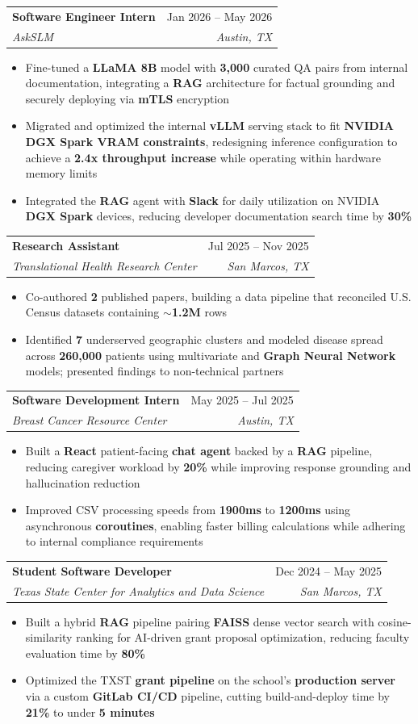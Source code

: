 \documentclass[letterpaper,10pt]{article}
\makeatletter
\newcommand{\resumeItem}[1]{
  \item\small{#1}\vspace{-3pt}
}
\newcommand{\resumeSubheading}[4]{
  \vspace{-2pt}\item
    \begin{tabular*}{0.97\textwidth}[t]{l@{\extracolsep{\fill}}r}
      \textbf{#3} & #2 \\
      \textit{\small#1} & \textit{\small #4} \\
    \end{tabular*}\vspace{-6pt}
}
\newcommand{\resumeItemListStart}{
  \begin{itemize}
}
\newcommand{\resumeItemListEnd}{
  \end{itemize}\vspace{-6pt}
}
\makeatother
\begin{document}
\resumeSubheading
  {AskSLM}{Jan 2026 -- May 2026}
  {Software Engineer Intern}{Austin, TX}
\resumeItemListStart
  \resumeItem{Fine-tuned a \textbf{LLaMA 8B} model with \textbf{3,000} curated QA pairs from internal documentation, integrating a \textbf{RAG} architecture for factual grounding and securely deploying via \textbf{mTLS} encryption}
  \resumeItem{Migrated and optimized the internal \textbf{vLLM} serving stack to fit \textbf{NVIDIA DGX Spark VRAM constraints}, redesigning inference configuration to achieve a \textbf{2.4x throughput increase} while operating within hardware memory limits}
  \resumeItem{Integrated the \textbf{RAG} agent with \textbf{Slack} for daily utilization on NVIDIA \textbf{DGX Spark} devices, reducing developer documentation search time by \textbf{30\%}}
\resumeItemListEnd

\resumeSubheading
  {Translational Health Research Center}{Jul 2025 -- Nov 2025}
  {Research Assistant}{San Marcos, TX}
\resumeItemListStart
  \resumeItem{Co-authored \textbf{2} published papers, building a data pipeline that reconciled U.S. Census datasets containing \textbf{$\sim$1.2M} rows}
  \resumeItem{Identified \textbf{7} underserved geographic clusters and modeled disease spread across \textbf{260,000} patients using multivariate and \textbf{Graph Neural Network} models; presented findings to non-technical partners}
\resumeItemListEnd

\resumeSubheading
  {Breast Cancer Resource Center}{May 2025 -- Jul 2025}
  {Software Development Intern}{Austin, TX}
\resumeItemListStart
  \resumeItem{Built a \textbf{React} patient-facing \textbf{chat agent} backed by a \textbf{RAG} pipeline, reducing caregiver workload by \textbf{20\%} while improving response grounding and hallucination reduction}
  \resumeItem{Improved CSV processing speeds from \textbf{1900ms} to \textbf{1200ms} using asynchronous \textbf{coroutines}, enabling faster billing calculations while adhering to internal compliance requirements}
\resumeItemListEnd

\resumeSubheading
  {Texas State Center for Analytics and Data Science}{Dec 2024 -- May 2025}
  {Student Software Developer}{San Marcos, TX}
\resumeItemListStart
  \resumeItem{Built a hybrid \textbf{RAG} pipeline pairing \textbf{FAISS} dense vector search with cosine-similarity ranking for AI-driven grant proposal optimization, reducing faculty evaluation time by \textbf{80\%}}
  \resumeItem{Optimized the TXST \textbf{grant pipeline} on the school's \textbf{production server} via a custom \textbf{GitLab CI/CD} pipeline, cutting build-and-deploy time by \textbf{21\%} to under \textbf{5 minutes}}
\resumeItemListEnd
\end{document}
